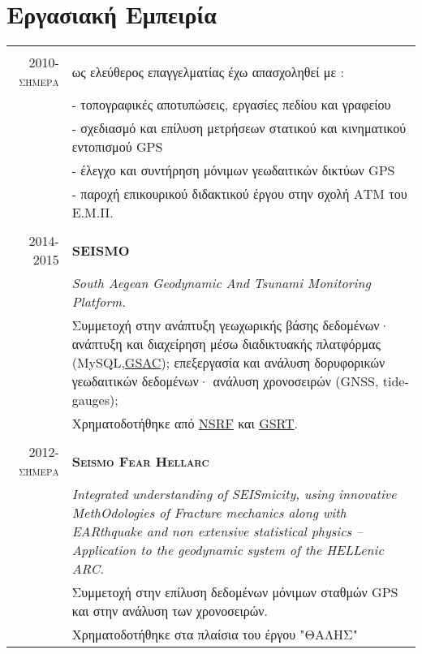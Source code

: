\documentclass[a4paper,10pt]{article} %
\begin{document}

\section{Εργασιακή Εμπειρία}

\begin{longtable}{r|p{13cm}}


\multicolumn{2}{c}{} \\
\textsc{2010-σήμερα} & ως ελεύθερος επαγγελματίας έχω απασχοληθεί με :\\ 
  & - τοπογραφικές αποτυπώσεις, εργασίες πεδίου και γραφείου \\
  & - σχεδιασμό και επίλυση μετρήσεων στατικού και κινηματικού εντοπισμού GPS\\
  & - έλεγχο και συντήρηση μόνιμων γεωδαιτικών δικτύων GPS\\
  & - παροχή επικουρικού διδακτικού έργου στην σχολή ΑΤΜ του Ε.Μ.Π. \\

\multicolumn{2}{c}{} \\
\textsc{2014-2015} & \textbf{\textsc{SEISMO}}\\
  & \textit{South Aegean Geodynamic And Tsunami Monitoring Platform.}\\
  & Συμμετοχή στην ανάπτυξη γεωχωρικής βάσης δεδομένων· ανάπτυξη και διαχείρηση μέσω διαδικτυακής πλατφόρμας (MySQL,\href{http://www.unavco.org/software/data-management/gsac/gsac.html}{GSAC});
    επεξεργασία και ανάλυση δορυφορικών γεωδαιτικών δεδομένων· ανάλυση χρονοσειρών (GNSS, tide-gauges); \\
  & Χρηματοδοτήθηκε από \href{http://www.espa.gr/en/Pages/Default.aspx}{NSRF} και \href{http://www.gsrt.gr/central.aspx?sId=119I428I1089I323I488743}{GSRT}.\\

\multicolumn{2}{c}{} \\
\textsc{2012-σήμερα} & \textbf{\textsc{Seismo Fear Hellarc}}\\
  & \textit{Integrated understanding of SEISmicity, using innovative MethOdologies of Fracture mechanics along with EARthquake and non extensive statistical physics – Application to the geodynamic system of the HELLenic ARC.}\\
  & Συμμετοχή στην επίλυση δεδομένων μόνιμων σταθμών GPS και στην ανάλυση των χρονοσειρών.\\
  & Χρηματοδοτήθηκε στα πλαίσια του έργου "ΘΑΛΗΣ"\\


\end{longtable}
\end{document}
